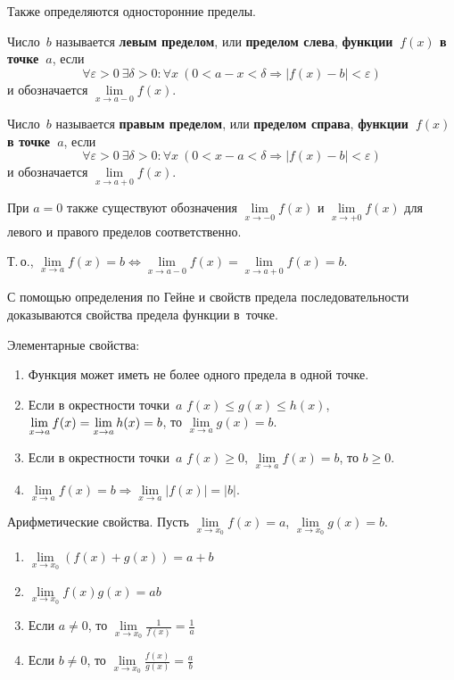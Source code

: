 Также определяются односторонние пределы.

Число~$b$ называется \textbf{левым пределом}, или \textbf{пределом слева}, \textbf{функции~$f(x)$ в точке~$a$}, если
\begin{equation*}
\forall \varepsilon > 0 \ \exists \delta > 0 \colon \forall x \ (0 < a - x < \delta \Rightarrow |f(x) - b| < \varepsilon)
\end{equation*}
и обозначается $\lim\limits_{x \to a-0} f(x)$.

Число~$b$ называется \textbf{правым пределом}, или \textbf{пределом справа}, \textbf{функции~$f(x)$ в точке~$a$}, если
\begin{equation*}
\forall \varepsilon > 0 \ \exists \delta > 0 \colon \forall x \ (0 < x - a < \delta \Rightarrow |f(x) - b| < \varepsilon)
\end{equation*}
и обозначается $\lim\limits_{x \to a+0} f(x)$.

При $a = 0$ также существуют обозначения $\lim\limits_{x \to -0} f(x)$ и $\lim\limits_{x \to +0} f(x)$ для левого и правого пределов соответственно.

Т.\,о., $\lim\limits_{x \to a} f(x) = b \Leftrightarrow \lim\limits_{x \to a-0} f(x) = \lim\limits_{x \to a+0} f(x) = b$.

С помощью определения по Гейне и свойств предела последовательности доказываются свойства предела функции в~точке.

Элементарные свойства:
\begin{enumerate}
	\item Функция может иметь не более одного предела в одной точке.
	\item \begin{theorem}
	\label{th:about_two_policemen}
	Если в окрестности точки~$a$ $f(x) \leqslant g(x) \leqslant h(x)$, $\lim\limits_{x \to a} f(x) \opbr= \lim\limits_{x \to a} h(x) \opbr= b$, то $\lim\limits_{x \to a} g(x) = b$.
	\end{theorem}
	\item Если в окрестности точки~$a$ $f(x) \geqslant 0$, $\lim\limits_{x \to a} f(x) = b$, то $b \geqslant 0$.
	\item $\lim\limits_{x \to a} f(x) = b \Rightarrow \lim\limits_{x \to a} |f(x)| = |b|$.
\end{enumerate}

Арифметические свойства.
Пусть $\lim\limits_{x \to x_0} f(x) = a$, $\lim\limits_{x \to x_0} g(x) = b$.
\begin{enumerate}
	\item $\lim\limits_{x \to x_0} (f(x) + g(x)) = a + b$
	\item $\lim\limits_{x \to x_0} f(x)g(x) = ab$
	\item Если $a \neq 0$, то $\lim\limits_{x \to x_0} \frac1{f(x)} = \frac1a$
	\item Если $b \neq 0$, то $\lim\limits_{x \to x_0} \frac{f(x)}{g(x)} = \frac{a}b$
\end{enumerate}

